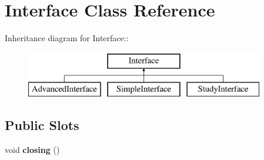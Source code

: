 \hypertarget{classInterface}{
\section{Interface Class Reference}
\label{classInterface}
}
Inheritance diagram for Interface::\begin{figure}[H]
\begin{center}
\leavevmode
\includegraphics[height=2cm]{classInterface}
\end{center}
\end{figure}
\subsection*{Public Slots}
\begin{DoxyCompactItemize}
\item 
\hypertarget{classInterface_a8324c4062e283e2b0bc21c3db79ff36b}{
void {\bfseries closing} ()}
\label{classInterface_a8324c4062e283e2b0bc21c3db79ff36b}

\end{DoxyCompactItemize}
